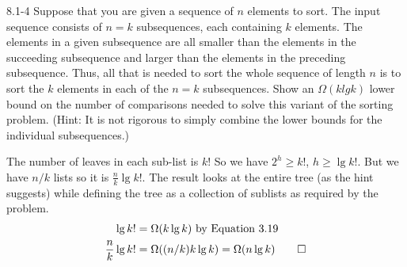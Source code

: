 \begin{problem}{8.1-4}
  Suppose that you are given a sequence of $n$ elements to sort. The input sequence consists of $n=k$ subsequences, each
  containing $k$ elements. The elements in a given subsequence are all smaller than the elements in the succeeding
  subsequence and larger than the elements in the preceding subsequence. Thus, all that is needed to sort the whole
  sequence of length $n$ is to sort the $k$ elements in each of the $n=k$ subsequences. Show an $\Omega(k lg k)$ lower
  bound on the number of comparisons needed to solve this variant of the sorting problem. (Hint: It is not rigorous to
  simply combine the lower bounds for the individual subsequences.)
  \begin{solution}
    The number of leaves in each sub-list is $k!$ So we have $2^h \ge k!$, $h \ge \lg k!$. But we have $n/k$ lists so it
    is $\frac{n}{k} \lg k!$. The result looks at the entire tree (as the hint suggests) while defining the tree as a
    collection of sublists as required by the problem.
    \vspace{12pt}
    \begin{align*}
      \lg k! &= \Omega(k \lg k)\text{ by Equation 3.19} \\
      \frac{n}{k} \lg k! &= \Omega((n/k)k \lg k) = \Omega(n \lg k) \qed
    \end{align*}
  \end{solution}
\end{problem}

